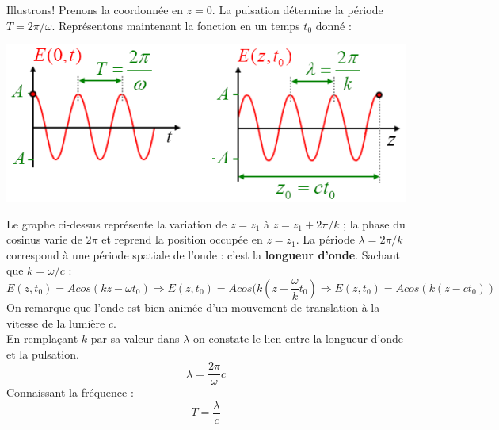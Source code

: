\documentclass	[11pt, a4paper, openany]{book}
\begin{document}
		Illustrons! Prenons la coordonnée en $z = 0$. La pulsation détermine la période $T = 2\pi /\omega$. Représentons maintenant la fonction en un temps $t_0$ donné : 
		\begin{center}
			\includegraphics[scale=0.5]{oo/image33.png}
		\end{center}
		Le graphe ci-dessus représente la variation de $z = z_1$ à $z = z_1 + 2\pi/k$ ; la phase du cosinus varie de $2\pi$ et reprend la position occupée en $z = z_1$.
		La période $\lambda = 2\pi / k$ correspond à une période spatiale de l'onde : c'est la \textbf{longueur d'onde}. Sachant que $k = \omega/c$ :
		\begin{equation}
			E(z, t_0) = Acos(kz - \omega t_0) \Rightarrow E(z, t_0) = Acos(k(z - \frac{\omega}{k} t_0) \Rightarrow E(z, t_0) = Acos(k(z - c t_0))
		\end{equation}
		On remarque que l'onde est bien animée d'un mouvement de translation à la vitesse de la lumière $c$.\\
		
		En remplaçant $k$ par sa valeur dans $\lambda$ on constate le lien entre la longueur d'onde et la pulsation.
		\begin{equation}
			\lambda = \frac{2\pi}{\omega}c
		\end{equation}
		Connaissant la fréquence : 
		\begin{equation}
			T = \frac{\lambda}{c}
		\end{equation}
		
\end{document}
